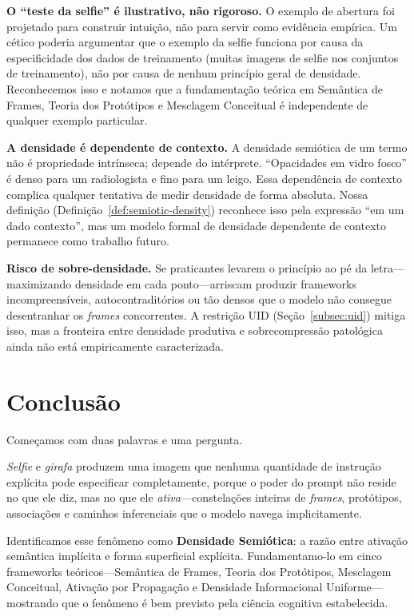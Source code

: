 \documentclass[12pt,a4paper]{article}
\begin{document}
\textbf{O ``teste da selfie'' é ilustrativo, não rigoroso.}
O exemplo de abertura foi projetado para construir intuição, não para servir como evidência empírica.
Um cético poderia argumentar que o exemplo da selfie funciona por causa da especificidade dos dados de treinamento (muitas imagens de selfie nos conjuntos de treinamento), não por causa de nenhum princípio geral de densidade.
Reconhecemos isso e notamos que a fundamentação teórica em Semântica de Frames, Teoria dos Protótipos e Mesclagem Conceitual é independente de qualquer exemplo particular.

\textbf{A densidade é dependente de contexto.}
A densidade semiótica de um termo não é propriedade intrínseca; depende do intérprete.
``Opacidades em vidro fosco'' é denso para um radiologista e fino para um leigo.
Essa dependência de contexto complica qualquer tentativa de medir densidade de forma absoluta.
Nossa definição (Definição~\ref{def:semiotic-density}) reconhece isso pela expressão ``em um dado contexto'', mas um modelo formal de densidade dependente de contexto permanece como trabalho futuro.

\textbf{Risco de sobre-densidade.}
Se praticantes levarem o princípio ao pé da letra---maximizando densidade em cada ponto---arriscam produzir frameworks incompreensíveis, autocontraditórios ou tão densos que o modelo não consegue desentranhar os \textit{frames} concorrentes.
A restrição UID (Seção~\ref{subsec:uid}) mitiga isso, mas a fronteira entre densidade produtiva e sobrecompressão patológica ainda não está empiricamente caracterizada.


\section{Conclusão}
\label{sec:conclusion}

Começamos com duas palavras e uma pergunta.

\textit{Selfie} e \textit{girafa} produzem uma imagem que nenhuma quantidade de instrução explícita pode especificar completamente, porque o poder do prompt não reside no que ele diz, mas no que ele \textit{ativa}---constelações inteiras de \textit{frames}, protótipos, associações e caminhos inferenciais que o modelo navega implicitamente.

Identificamos esse fenômeno como \textbf{Densidade Semiótica}: a razão entre ativação semântica implícita e forma superficial explícita.
Fundamentamo-lo em cinco frameworks teóricos---Semântica de Frames, Teoria dos Protótipos, Mesclagem Conceitual, Ativação por Propagação e Densidade Informacional Uniforme---mostrando que o fenômeno é bem previsto pela ciência cognitiva estabelecida.
\end{document}

